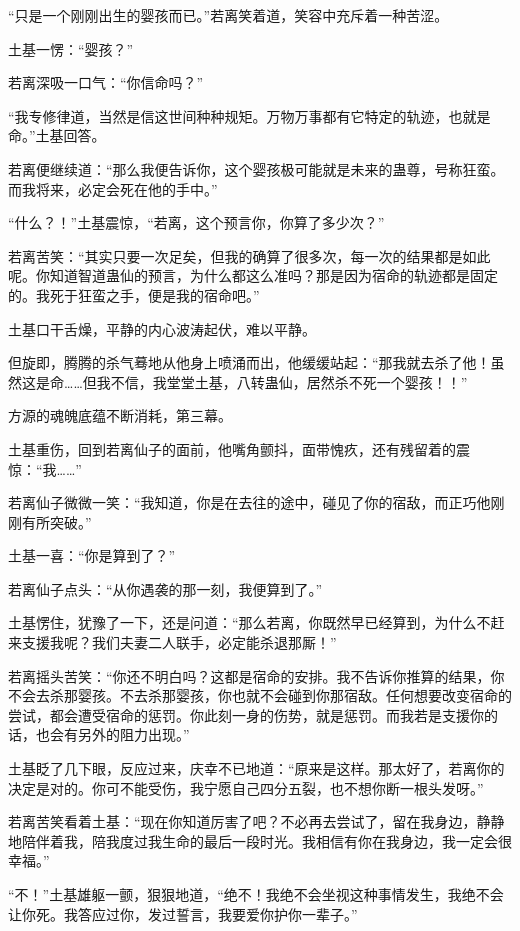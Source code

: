 \begin{this_body}
“只是一个刚刚出生的婴孩而已。”若离笑着道，笑容中充斥着一种苦涩。

土基一愣：“婴孩？”

若离深吸一口气：“你信命吗？”

“我专修律道，当然是信这世间种种规矩。万物万事都有它特定的轨迹，也就是命。”土基回答。

若离便继续道：“那么我便告诉你，这个婴孩极可能就是未来的蛊尊，号称狂蛮。而我将来，必定会死在他的手中。”

“什么？！”土基震惊，“若离，这个预言你，你算了多少次？”

若离苦笑：“其实只要一次足矣，但我的确算了很多次，每一次的结果都是如此呢。你知道智道蛊仙的预言，为什么都这么准吗？那是因为宿命的轨迹都是固定的。我死于狂蛮之手，便是我的宿命吧。”

土基口干舌燥，平静的内心波涛起伏，难以平静。

但旋即，腾腾的杀气蓦地从他身上喷涌而出，他缓缓站起：“那我就去杀了他！虽然这是命……但我不信，我堂堂土基，八转蛊仙，居然杀不死一个婴孩！！”

方源的魂魄底蕴不断消耗，第三幕。

土基重伤，回到若离仙子的面前，他嘴角颤抖，面带愧疚，还有残留着的震惊：“我……”

若离仙子微微一笑：“我知道，你是在去往的途中，碰见了你的宿敌，而正巧他刚刚有所突破。”

土基一喜：“你是算到了？”

若离仙子点头：“从你遇袭的那一刻，我便算到了。”

土基愣住，犹豫了一下，还是问道：“那么若离，你既然早已经算到，为什么不赶来支援我呢？我们夫妻二人联手，必定能杀退那厮！”

若离摇头苦笑：“你还不明白吗？这都是宿命的安排。我不告诉你推算的结果，你不会去杀那婴孩。不去杀那婴孩，你也就不会碰到你那宿敌。任何想要改变宿命的尝试，都会遭受宿命的惩罚。你此刻一身的伤势，就是惩罚。而我若是支援你的话，也会有另外的阻力出现。”

土基眨了几下眼，反应过来，庆幸不已地道：“原来是这样。那太好了，若离你的决定是对的。你可不能受伤，我宁愿自己四分五裂，也不想你断一根头发呀。”

若离苦笑看着土基：“现在你知道厉害了吧？不必再去尝试了，留在我身边，静静地陪伴着我，陪我度过我生命的最后一段时光。我相信有你在我身边，我一定会很幸福。”

“不！”土基雄躯一颤，狠狠地道，“绝不！我绝不会坐视这种事情发生，我绝不会让你死。我答应过你，发过誓言，我要爱你护你一辈子。”


\end{this_body}
